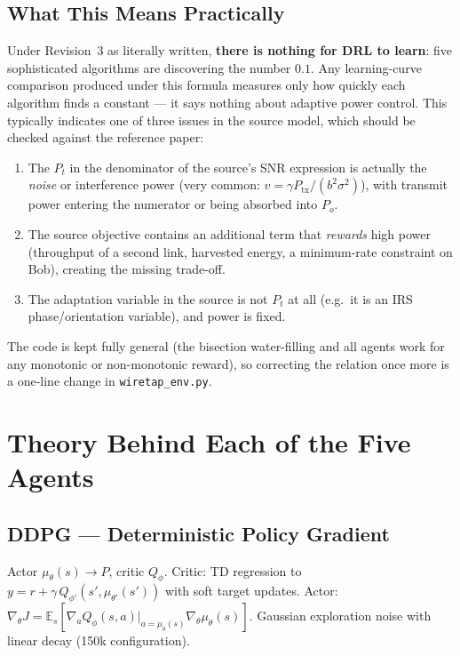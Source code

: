 \documentclass[11pt]{article}
\newcommand{\E}{\mathbb{E}}
\begin{document}
\subsection{What This Means Practically}
Under Revision~3 as literally written, \textbf{there is nothing for DRL to learn}: five
sophisticated algorithms are discovering the number $0.1$. Any learning-curve comparison produced
under this formula measures only how quickly each algorithm finds a constant --- it says nothing
about adaptive power control. This typically indicates one of three issues in the source model,
which should be checked against the reference paper:
\begin{enumerate}[nosep]
\item The $P_t$ in the denominator of the source's SNR expression is actually the \emph{noise}
or interference power (very common: $v = \gamma P_{\mathrm{tx}} / (b^2\sigma^2)$), with transmit
power entering the numerator or being absorbed into $P_o$.
\item The source objective contains an additional term that \emph{rewards} high power (throughput
of a second link, harvested energy, a minimum-rate constraint on Bob), creating the missing
trade-off.
\item The adaptation variable in the source is not $P_t$ at all (e.g.\ it is an IRS phase/orientation
variable), and power is fixed.
\end{enumerate}
The code is kept fully general (the bisection water-filling and all agents work for any monotonic
or non-monotonic reward), so correcting the relation once more is a one-line change in
\texttt{wiretap\_env.py}.

\section{Theory Behind Each of the Five Agents}

\subsection{DDPG --- Deterministic Policy Gradient}
Actor $\mu_\theta(s)\!\to\!P$, critic $Q_\phi$. Critic: TD regression to
$y = r + \gamma\,Q_{\phi'}(s',\mu_{\theta'}(s'))$ with soft target updates. Actor:
$\nabla_\theta J = \E_s[\nabla_a Q_\phi(s,a)|_{a=\mu_\theta(s)}\nabla_\theta\mu_\theta(s)]$.
Gaussian exploration noise with linear decay (150k configuration).
\end{document}
